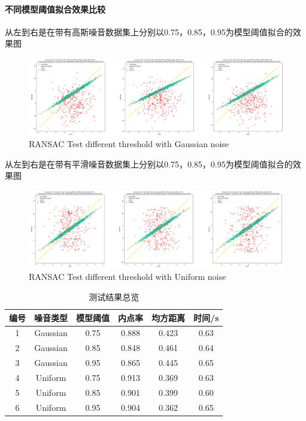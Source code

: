 \documentclass{seuer}
\begin{document}
\paragraph{不同模型阈值拟合效果比较}

从左到右是在带有高斯噪音数据集上分别以0.75，0.85，0.95为模型阈值拟合的效果图
\begin{figure}[H]
  \centering
  \includegraphics[scale=0.1]{./image/test_threshold_model_Gaussian.png}
  \caption{RANSAC Test different threshold with Gaussian noise} \label{fig:eg}
\end{figure}
从左到右是在带有平滑噪音数据集上分别以0.75，0.85，0.95为模型阈值拟合的效果图
\begin{figure}[H]
  \centering
  \includegraphics[scale=0.1]{./image/test_threshold_model_Uniform.png}
  \caption{RANSAC Test different threshold with Uniform noise} \label{fig:eg}
\end{figure}
\newpage
\begin{table}[h]
  \centering
  \captionnamefont{\wuhao\bf\heiti}
  \captiontitlefont{\wuhao\bf\heiti}
  \caption{测试结果总览} \label{tab:eg1}
  \liuhao
  \begin{tabular}{cccccc}
  \toprule
  {编号} & {噪音类型} & {模型阈值} & {内点率} & {均方距离} & {时间/s} \\
  \midrule 
  1 & Gaussian & 0.75 & 0.888 & 0.423 & 0.63 \\
  2 & Gaussian & 0.85 & 0.848 & 0.461 & 0.64 \\
  3 & Gaussian & 0.95 & 0.865 & 0.445 & 0.65\\
  4 & Uniform  & 0.75 & 0.913 & 0.369 & 0.63\\
  5 & Uniform  & 0.85 & 0.901 & 0.399 & 0.60\\
  6 & Uniform  & 0.95 & 0.904 & 0.362 & 0.65\\
  \bottomrule
  \end{tabular}
\end{table}
\end{document}
